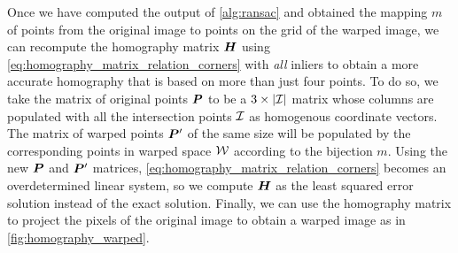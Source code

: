 \documentclass[../main.tex]{subfiles}
\begin{document}
Once we have computed the output of \cref{alg:ransac} and obtained the mapping $m$ of points from the original image to points on the grid of the warped image, we can recompute the homography matrix ${\bm{H}}$ using \cref{eq:homography_matrix_relation_corners} with \emph{all} inliers to obtain a more accurate homography that is based on more than just four points.
To do so, we take the matrix of original points ${\bm{P}}$ to be a $3 \times \lvert{\mathcal{I}}\rvert$ matrix whose columns are populated with all the intersection points ${\mathcal{I}}$ as homogenous coordinate vectors.
The matrix of warped points ${\bm{P}}'$ of the same size will be populated by the corresponding points in warped space ${\mathcal{W}}$ according to the bijection $m$.
Using the new ${\bm{P}}$ and ${\bm{P}}'$ matrices, \cref{eq:homography_matrix_relation_corners} becomes an overdetermined linear system, so we compute ${\bm{H}}$ as the least squared error solution instead of the exact solution.
Finally, we can use the homography matrix to project the pixels of the original image to obtain a warped image as in \cref{fig:homography_warped}. 
\end{document}
